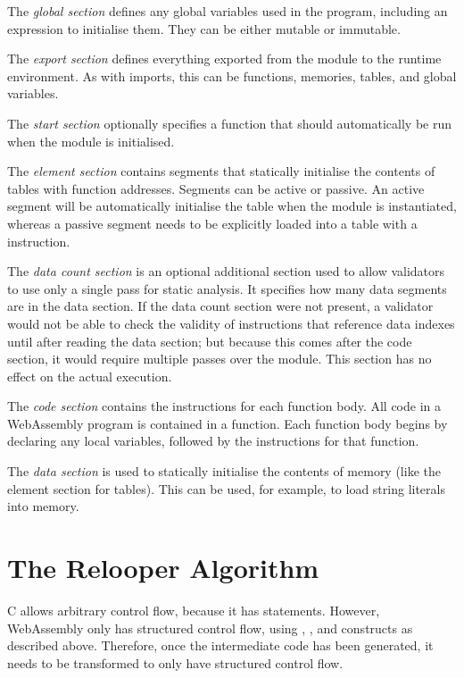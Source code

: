 \documentclass[00-main.tex]{subfiles}
\begin{document}
The \emph{global section} defines any global variables used in the program, including an expression to initialise them. They can be either mutable or immutable.

The \emph{export section} defines everything exported from the module to the runtime environment.
As with imports, this can be functions, memories, tables, and global variables.

The \emph{start section} optionally specifies a function that should automatically be run when the module is initialised.

The \emph{element section} contains segments that statically initialise the contents of tables with function addresses.
Segments can be active or passive.
An active segment will be automatically initialise the table when the module is instantiated, whereas a passive segment needs to be explicitly loaded into a table with a  instruction.

The \emph{data count section} is an optional additional section used to allow validators to use only a single pass for static analysis.
It specifies how many data segments are in the data section.
If the data count section were not present, a validator would not be able to check the validity of instructions that reference data indexes until after reading the data section; but because this comes after the code section, it would require multiple passes over the module.
This section has no effect on the actual execution.

The \emph{code section} contains the instructions for each function body.
All code in a WebAssembly program is contained in a function.
Each function body begins by declaring any local variables, followed by the instructions for that function.

The \emph{data section} is used to statically initialise the contents of memory (like the element section for tables).
This can be used, for example, to load string literals into memory.


\section{The Relooper Algorithm}\label{sec:prep:relooper}

C allows arbitrary control flow, because it has  statements.
However, WebAssembly only has structured control flow, using , , and  constructs as described above.
Therefore, once the intermediate code has been generated, it needs to be transformed to only have structured control flow.
\end{document}
